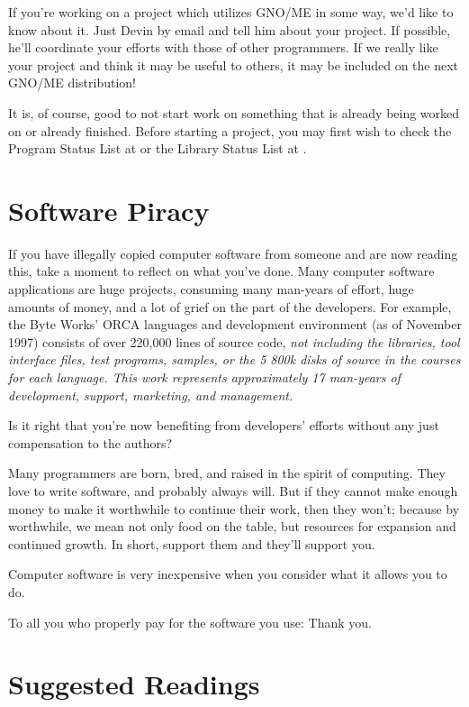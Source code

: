 \documentclass{report}
\begin{document}
If you're working on a project which
utilizes GNO/ME in some way, we'd like to know about it. Just
Devin by email and tell him about your project. If possible, he'll
coordinate your efforts with those of other programmers. If we
really like your project and think it may be useful to others, it
may be included on the next GNO/ME distribution!

It is, of course, good to not start work on something that is already
being worked on or already finished.  Before starting a project, you may
first wish to check the Program Status List at
or the Library Status List at
.

\section{Software Piracy}

If you have illegally copied computer software from someone
and are now reading this, take a moment to reflect on what you've done.
Many computer software applications are huge projects, consuming
many man-years of effort, huge amounts of money, and a lot of grief on the
part of the developers.
For example, the Byte Works' ORCA languages and development 
environment (as of November 1997) consists of over 220,000 lines
of source code, \em not \rm  including the libraries, tool 
interface files, test programs, samples, or the 5 800k disks
of source in the courses for each language.  This work represents
approximately 17 man-years of development, support, marketing,
and management.

Is it right that you're now benefiting from
developers' efforts without any just compensation to the authors?

Many programmers are born, bred, and raised in the spirit of
computing. They love to write software, and probably always
will. But if they cannot make enough money to make it
worthwhile to continue their work, then they won't; because by
worthwhile, we mean not only food on the table, but resources for
expansion and continued growth. In short,
support them and they'll support you.
 
Computer software is very inexpensive when you
consider what it allows you to do.
 
To all you who properly pay for the software you use:
Thank you.

\section{Suggested Readings}
\end{document}
